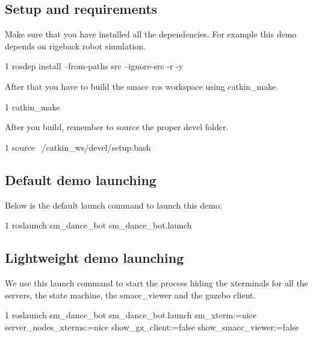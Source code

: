 \subsection*{Setup and requirements}

Make sure that you have installed all the dependencies. For example this demo depends on rigeback robot simulation.


\begin{DoxyCode}
1 rosdep install --from-paths src --ignore-src -r -y 
\end{DoxyCode}


After that you have to build the smacc ros workspace using catkin\+\_\+make.


\begin{DoxyCode}
1 catkin\_make
\end{DoxyCode}


After you build, remember to source the proper devel folder.


\begin{DoxyCode}
1 source ~/catkin\_ws/devel/setup.bash
\end{DoxyCode}


\subsection*{Default demo launching}

Below is the default launch command to launch this demo\+:


\begin{DoxyCode}
1 roslaunch sm\_dance\_bot sm\_dance\_bot.launch
\end{DoxyCode}


\subsection*{Lightweight demo launching}

We use this launch command to start the process hiding the xterminals for all the servers, the state machine, the smacc\+\_\+viewer and the gazebo client.


\begin{DoxyCode}
1 roslaunch sm\_dance\_bot sm\_dance\_bot.launch sm\_xterm:=nice server\_nodes\_xterms:=nice show\_gz\_client:=false
       show\_smacc\_viewer:=false
\end{DoxyCode}
 